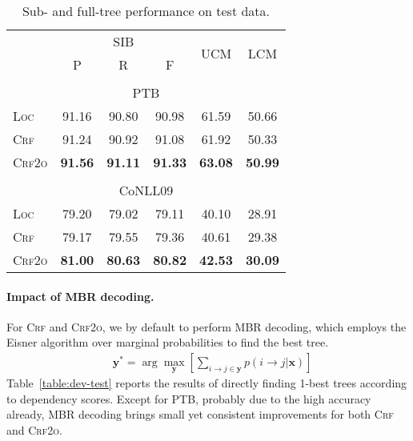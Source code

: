 \documentclass[11pt,a4paper]{article}
\begin{document}
\begin{table}[tb]
\setlength{\tabcolsep}{5pt}
\centering
\begin{tabular}{lccccc}
\toprule
& \multicolumn{3}{c}{SIB} & \multirow{2}{*}{UCM} & \multirow{2}{*}{LCM} \\
& P & R & F \\[2pt]
\hline
\\[-9pt]
\multicolumn{6}{c}{PTB} \\
\textsc{Loc}  & 91.16 & 90.80 & 90.98 & 61.59 & 50.66 \\
\textsc{Crf}    & 91.24 & 90.92 & 91.08 & 61.92 & 50.33 \\
\textsc{Crf2o} & \textbf{91.56} & \textbf{91.11} & \textbf{91.33} & \textbf{63.08} & \textbf{50.99} \\[2pt]
\hline
\\[-9pt]
\multicolumn{6}{c}{CoNLL09} \\
\textsc{Loc}  & 79.20 & 79.02 & 79.11 & 40.10 & 28.91 \\
\textsc{Crf}    & 79.17 & 79.55 & 79.36 & 40.61 & 29.38 \\
\textsc{Crf2o} & \textbf{81.00} & \textbf{80.63} & \textbf{80.82} & \textbf{42.53} & \textbf{30.09} \\
\bottomrule
\end{tabular}
\caption{Sub- and full-tree performance on test data.}
\label{table:dev-test-subtree}

\end{table} 


\paragraph{Impact of MBR decoding.} For \textsc{Crf} and \textsc{Crf2o}, we by default to perform MBR decoding, which employs the Eisner algorithm over marginal probabilities \cite{smith-smith-2007-probabilistic} to find the best tree.
\begin{equation}
\begin{split}
& {\boldsymbol{y}}^* = \arg\max_{\boldsymbol{y}} \left[\sum_{i \rightarrow j \in \boldsymbol{y}}{p(i \rightarrow j|\boldsymbol{x})} \right]
\end{split}
\end{equation}
Table~\ref{table:dev-test} reports the results of directly finding 1-best trees according to dependency scores. Except for PTB, probably due to the high accuracy already, MBR decoding brings small yet consistent improvements for both \textsc{Crf} and \textsc{Crf2o}.
\end{document}
